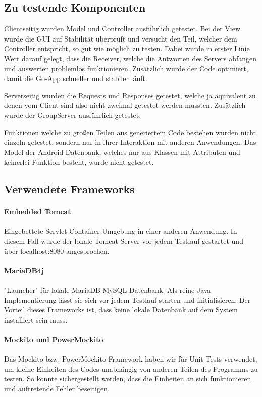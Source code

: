 \subsection{Zu testende Komponenten}

	Clientseitig wurden Model und Controller ausführlich getestet. Bei der View wurde die GUI auf Stabilität überprüft und versucht den Teil, welcher dem Controller entspricht, so gut wie möglich zu testen. Dabei wurde in erster Linie Wert darauf gelegt, dass die Receiver, welche die Antworten des Servers abfangen und auswerten problemlos funktionieren. Zusätzlich wurde der Code optimiert, damit die Go-App schneller und stabiler läuft.

	Serverseitig wurden die Requests und Responses getestet, welche ja äquivalent zu denen vom Client sind also nicht zweimal getestet werden mussten. Zusätzlich wurde der GroupServer ausführlich getestet.

	Funktionen welche zu großen Teilen aus generiertem Code bestehen wurden nicht einzeln getestet, sondern nur in ihrer Interaktion mit anderen Anwendungen.
	Das Model der Android Datenbank, welches nur aus Klassen mit Attributen und keinerlei Funktion besteht, wurde nicht getestet.

\subsection{Verwendete Frameworks}
     \paragraph{Embedded Tomcat}
     Eingebettete Servlet-Container Umgebung in einer anderen Anwendung. In diesem Fall wurde der lokale Tomcat Server vor jedem Testlauf gestartet und über localhost:8080 angesprochen.

     \paragraph{MariaDB4j}
     "Launcher" für lokale MariaDB MySQL Datenbank. Als reine Java Implementierung lässt sie sich vor jedem Testlauf starten und initialisieren.
     Der Vorteil dieses Frameworks ist, dass keine lokale Datenbank auf dem System installiert sein muss.

	\paragraph{Mockito und PowerMockito}
	Das Mockito bzw. PowerMockito Framework haben wir für Unit Tests verwendet, um kleine Einheiten des Codes unabhängig von anderen Teilen des Programms zu testen. So konnte sichergestellt werden, dass die Einheiten an sich funktionieren und auftretende Fehler beseitigen.

